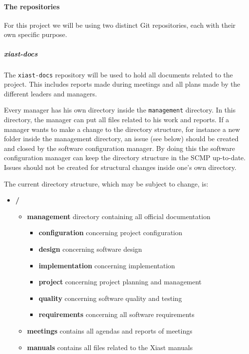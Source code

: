 \documentclass[9pt]{article}
\begin{document}
\paragraph{The repositories}\label{the-repositories}

For this project we will be using two distinct Git repositories, each
with their own specific purpose.

\subparagraph{xiast-docs}\label{xiast-docs}

The \texttt{xiast-docs} repository will be used to hold all documents
related to the project. This includes reports made during meetings and
all plans made by the different leaders and managers.

Every manager has his own directory inside the \texttt{management}
directory. In this directory, the manager can put all files related to
his work and reports. If a manager wants to make a change to the
directory structure, for instance a new folder inside the management
directory, an issue (see below) should be created and closed by the
software configuration manager. By doing this the software configuration
manager can keep the directory structure in the SCMP up-to-date. Issues
should not be created for structural changes inside one's own directory.

The current directory structure, which may be subject to change, is:

\begin{itemize}
\itemsep1pt\parskip0pt
\item
  \textbf{/}

  \begin{itemize}
  \itemsep1pt\parskip0pt
  \item
    \textbf{management} directory containing all official documentation

    \begin{itemize}
    \itemsep1pt\parskip0pt
    \item
      \textbf{configuration} concerning project configuration
    \item
      \textbf{design} concerning software design
    \item
      \textbf{implementation} concerning implementation
    \item
      \textbf{project} concerning project planning and management
    \item
      \textbf{quality} concerning software quality and testing
    \item
      \textbf{requirements} concerning all software requirements
    \end{itemize}
  \item
    \textbf{meetings} contains all agendas and reports of meetings
  \item
    \textbf{manuals} contains all files related to the Xiast manuals
  \end{itemize}
\end{itemize}
\end{document}
